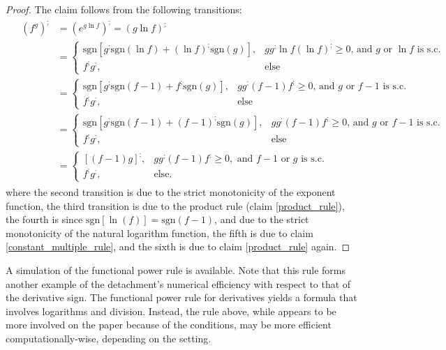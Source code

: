 \documentclass[11pt]{book}
\begin{document}
\begin{proof}The claim follows from the following transitions: \begin{align}
&\begin{aligned}
\left(f^{g}\right)^{;} & =\left(e^{g\ln f}\right)^{;}=\left(g\ln f\right)^{;}\\
& =\begin{cases}
\text{sgn}\left[g^{;}\text{sgn}\left(\ln f\right)+\left(\ln f\right)^{;}\text{sgn}\left(g\right)\right], & gg^{;}\ln f\left(\ln f\right)^{;}\geq0\text{, and }g\text{ or }\ln f\text{ is s.c.}\\
f^{;}g^{;}, & \text{else}
\end{cases}\\
& =\begin{cases}
\text{sgn}\left[g^{;}\text{sgn}\left(f-1\right)+f^{;}\text{sgn}\left(g\right)\right], & gg^{;}\left(f-1\right)f^{;}\geq0\text{, and }g\text{ or }f-1\text{ is s.c.}\\
f^{;}g^{;}, & \text{else}
\end{cases}\\
& =\begin{cases}
\text{sgn}\left[g^{;}\text{sgn}\left(f-1\right)+\left(f-1\right)^{;}\text{sgn}\left(g\right)\right], & gg^{;}\left(f-1\right)f^{;}\geq0\text{, and }g\text{ or }f-1\text{ is s.c.}\\
f^{;}g^{;}, & \text{else}
\end{cases}\\
& =\begin{cases}
\left[\left(f-1\right)g\right]^{;}, & gg^{;}\left(f-1\right)f^{;}\geq0,\text{ and }f-1\text{ or }g\text{ is s.c.}\\
f^{;}g^{;}, & \text{else.}
\end{cases}
\end{aligned}
\end{align}
where the second transition is due to the strict monotonicity of the exponent function, the third transition is due to the product rule (claim \ref{product_rule}), the fourth is since $\text{sgn}\left[\ln\left(f\right)\right]=\text{sgn}\left(f-1\right)$, and due to the strict monotonicity of the natural logarithm function, the fifth is due to claim \ref{constant_multiple_rule}, and the sixth is due to claim \ref{product_rule} again.
\end{proof}

A simulation of the functional power rule is available. Note that this rule forms another example of the detachment's numerical efficiency with respect to that of the derivative sign. The functional power rule for derivatives yields a formula that involves logarithms and division. Instead, the rule above, while appears to be more involved on the paper because of the conditions, may be more efficient computationally-wise, depending on the setting.
\end{document}
